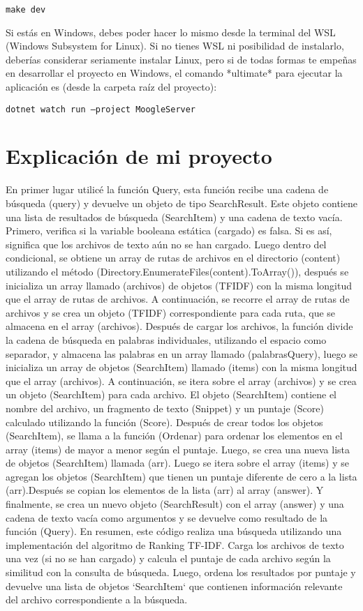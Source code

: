 \documentclass{article}
\begin{document}
{\tt make dev}

Si estás en Windows, debes poder hacer lo mismo desde la terminal del WSL (Windows Subsystem for Linux). Si no tienes WSL ni posibilidad de instalarlo, deberías considerar seriamente instalar Linux, pero si de todas formas te empeñas en desarrollar el proyecto en Windows, el comando *ultimate* para ejecutar la aplicación es (desde la carpeta raíz del proyecto):


{\tt dotnet watch run --project MoogleServer}



 \section{Explicación de mi proyecto}


En primer lugar utilicé la función Query, esta función recibe una cadena de búsqueda (query) y devuelve un objeto de tipo SearchResult. Este objeto contiene una lista de resultados de búsqueda (SearchItem) y una cadena de texto vacía.  Primero, verifica si la variable booleana estática (cargado) es falsa. Si es así, significa que los archivos de texto aún no se han cargado. Luego dentro del condicional, se obtiene un array de rutas de archivos en el directorio (content) utilizando el método (Directory.EnumerateFiles(content).ToArray()), después se inicializa un array llamado (archivos) de objetos (TFIDF) con la misma longitud que el array de rutas de archivos.  A continuación, se recorre el array de rutas de archivos y se crea un objeto (TFIDF) correspondiente para cada ruta, que se almacena en el array (archivos).  Después de cargar los archivos, la función divide la cadena de búsqueda en palabras individuales, utilizando el espacio como separador, y almacena las palabras en un array llamado (palabrasQuery), luego se inicializa un array de objetos (SearchItem) llamado (items) con la misma longitud que el array (archivos).  A continuación, se itera sobre el array (archivos) y se crea un objeto (SearchItem) para cada archivo. El objeto (SearchItem) contiene el nombre del archivo, un fragmento de texto (Snippet) y un puntaje (Score) calculado utilizando la función (Score). Después de crear todos los objetos (SearchItem), se llama a la función (Ordenar) para ordenar los elementos en el array (items) de mayor a menor según el puntaje. Luego, se crea una nueva lista de objetos (SearchItem) llamada (arr). Luego  se itera sobre el array (items) y se agregan los objetos (SearchItem) que tienen un puntaje diferente de cero a la lista (arr).Después se copian los elementos de la lista (arr) al array (answer). Y finalmente, se crea un nuevo objeto (SearchResult) con el array (answer) y una cadena de texto vacía como argumentos y se devuelve como resultado de la función (Query). En resumen, este código realiza una búsqueda utilizando una implementación del algoritmo de Ranking TF-IDF. Carga los archivos de texto una vez (si no se han cargado) y calcula el puntaje de cada archivo según la similitud con la consulta de búsqueda. Luego, ordena los resultados por puntaje y devuelve una lista de objetos `SearchItem` que contienen información relevante del archivo correspondiente a la búsqueda.


  
\end{document}
